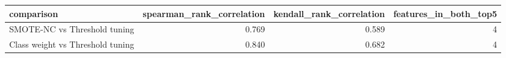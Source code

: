 \begin{tabular}{lrrr}
\toprule
comparison & spearman_rank_correlation & kendall_rank_correlation & features_in_both_top5 \\
\midrule
SMOTE-NC vs Threshold tuning & 0.769 & 0.589 & 4 \\
Class weight vs Threshold tuning & 0.840 & 0.682 & 4 \\
\bottomrule
\end{tabular}

